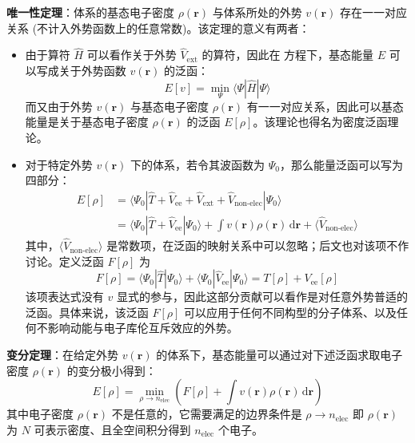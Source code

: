 \textbf{唯一性定理}：体系的基态电子密度 $\rho(\bm{r})$ 与体系所处的外势 $v(\bm{r})$ 存在一一对应关系 (不计入外势函数上的任意常数)。该定理的意义有两者：
\begin{itemize}[nosep]
  \item 由于算符 $\hat H$ 可以看作关于外势 $\hat V_\mathrm{ext}$ 的算符，因此在 \Schrodinger 方程下，基态能量 $E$ 可以写成关于外势函数 $v(\bm{r})$ 的泛函：
  \begin{equation}
    \label{eq.1.true-system-variation}
    E[v] = \min_\Psi \langle \Psi | \hat H | \Psi \rangle
  \end{equation}
  而又由于外势 $v(\bm{r})$ 与基态电子密度 $\rho(\bm{r})$ 有一一对应关系，因此可以基态能量是关于基态电子密度 $\rho(\bm{r})$ 的泛函 $E[\rho]$。该理论也得名为密度泛函理论。
  
  \item 对于特定外势 $v(\bm{r})$ 下的体系，若令其波函数为 $\Psi_0$，那么能量泛函可以写为四部分：
  \begin{align*}
    E[\rho] &= \langle \Psi_0 | \hat T + \hat V_\mathrm{ee} + \hat V_\mathrm{ext} + \hat V_\text{non-elec} | \Psi_0 \rangle \\
    &= \langle \Psi_0 | \hat T + \hat V_\mathrm{ee} | \Psi_0 \rangle + \int v (\bm{r}) \rho (\bm{r}) \, \mathrm{d} \bm{r} + \langle \hat V_\text{non-elec} \rangle
  \end{align*}
  其中，$\langle \hat V_\text{non-elec} \rangle$ 是常数项，在泛函的映射关系中可以忽略；后文也对该项不作讨论。定义泛函 $F[\rho]$ 为
  \begin{equation}
    \label{eq.1.f-functional-interacting-system}
    F[\rho] = \langle \Psi_0 | \hat T | \Psi_0 \rangle + \langle \Psi_0 | \hat V_\mathrm{ee} | \Psi_0 \rangle = T[\rho] + V_\mathrm{ee}[\rho]
  \end{equation}
  该项表达式没有 $v$ 显式的参与，因此这部分贡献可以看作是对任意外势普适的泛函。具体来说，该泛函 $F[\rho]$ 可以应用于任何不同构型的分子体系、以及任何不影响动能与电子库伦互斥效应的外势。
\end{itemize}

\textbf{变分定理}：在给定外势 $v(\bm{r})$ 的体系下，基态能量可以通过对下述泛函求取电子密度 $\rho(\bm{r})$ 的变分极小得到：
\begin{equation}
  E[\rho] = \min_{\rho \rightarrow n_\mathrm{elec}} \left( F[\rho] + \int v (\bm{r}) \rho (\bm{r}) \, \mathrm{d} \bm{r} \right)
\end{equation}
其中电子密度 $\rho(\bm{r})$ 不是任意的，它需要满足的边界条件是 $\rho \rightarrow n_\mathrm{elec}$ 即 $\rho(\bm{r})$ 为 $N$ 可表示密度、且全空间积分得到 $n_\mathrm{elec}$ 个电子。

